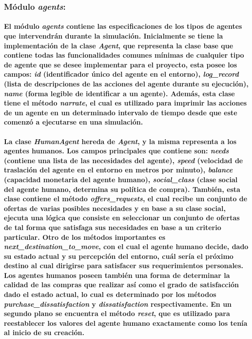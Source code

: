 \documentclass[12pt]{amsart}
\begin{document}
	\subsubsection{Módulo \textit{agents}:}\label{subsubsec:agents}

	\paragraph{El módulo \textit{agents} contiene las especificaciones de los tipos de agentes que intervendrán durante la simulación. Inicialmente se tiene la implementación de la clase \textit{Agent}, que representa la clase base que contiene todas las funcionalidades comunes mínimas de cualquier tipo de agente que se desee implementar para el proyecto, esta posee los campos: \textit{id} (identificador único del agente en el entorno), \textit{log\_record} (lista de descripciones de las acciones del agente durante su ejecución), \textit{name} (forma legible de identificar a un agente). Además, esta clase tiene el método \textit{narrate}, el cual es utilizado para imprimir las acciones de un agente en un determinado intervalo de tiempo desde que este comenzó a ejecutarse en una simulación.}

\paragraph{La clase \textit{HumanAgent} hereda de \textit{Agent}, y la misma representa a los agentes humanos. Los campos principales que contiene son: \textit{needs} (contiene una lista de las necesidades del agente), \textit{speed} (velocidad de traslación del agente en el entorno en metros por minuto), \textit{balance} (capacidad monetaria del agente humano), \textit{social\_class} (clase social del agente humano, determina su política de compra). También, esta clase contiene el método \textit{offers\_requests}, el cual recibe un conjunto de ofertas de varias posibles necesidades y en base a su clase social, ejecuta una lógica que consiste en seleccionar un conjunto de ofertas de tal forma que satisfaga sus necesidades en base a un criterio particular. Otro de los métodos importantes es \textit{next\_destination\_to\_move}, con el cual el agente humano decide, dado su estado actual y su percepción del entorno, cuál sería el próximo destino al cual dirigirse para satisfacer sus requerimientos personales. Los agentes humanos poseen también una forma de determinar la calidad de las compras que realizar así como el grado de satisfacción dado el estado actual, lo cual es determinado por los métodos \textit{purchase\_dissatisfaction} y \textit{dissatisfaction} respectivamente. En un segundo plano se encuentra el método \textit{reset}, que es utilizado para reestablecer los valores del agente humano exactamente como los tenía al inicio de su creación.}
\end{document}
